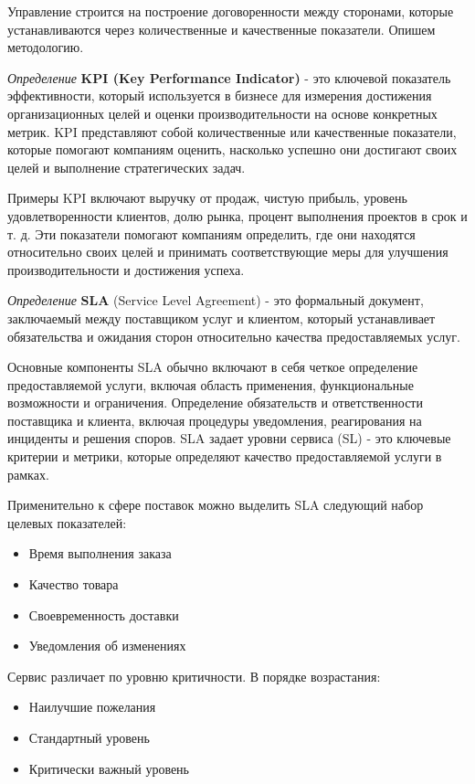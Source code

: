 Управление строится на построение договоренности между сторонами, которые устанавливаются через количественные и качественные показатели. Опишем методологию.

\textit{Определение} \textbf{KPI (Key Performance Indicator)} - это ключевой показатель эффективности, который используется в бизнесе для измерения достижения организационных целей и оценки производительности на основе конкретных метрик. KPI представляют собой количественные или качественные показатели, которые помогают компаниям оценить, насколько успешно они достигают своих целей и выполнение стратегических задач.

Примеры KPI включают выручку от продаж, чистую прибыль, уровень удовлетворенности клиентов, долю рынка, процент выполнения проектов в срок и т. д. Эти показатели помогают компаниям определить, где они находятся относительно своих целей и принимать соответствующие меры для улучшения производительности и достижения успеха.

\textit{Определение} \textbf{SLA} (Service Level Agreement) - это формальный документ, заключаемый между поставщиком услуг  и клиентом, который устанавливает обязательства и ожидания сторон относительно качества предоставляемых услуг. 

Основные компоненты SLA обычно включают в себя четкое определение предоставляемой услуги, включая область применения, функциональные возможности и ограничения. Определение обязательств и ответственности поставщика и клиента, включая процедуры уведомления, реагирования на инциденты и решения споров. SLA задает уровни сервиса (SL) - это ключевые критерии и метрики, которые определяют качество предоставляемой услуги в рамках.

Применительно к сфере поставок можно выделить SLA следующий набор целевых показателей:
\begin{itemize}
    \item Время выполнения заказа
    \item Качество товара
    \item Своевременность доставки
    \item Уведомления об изменениях
\end{itemize}

Сервис различает по уровню критичности. В порядке возрастания:
\begin{itemize}
    \item Наилучшие пожелания
    \item Стандартный уровень
    \item Критически важный уровень
\end{itemize}

